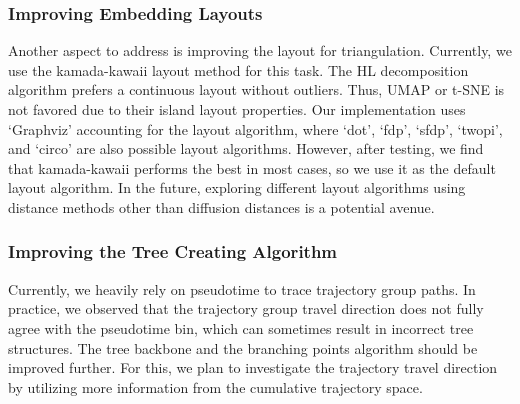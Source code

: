 \subsubsection{Improving Embedding Layouts}
Another aspect to address is improving the layout for triangulation. Currently, we use the kamada-kawaii layout method for this task. The HL decomposition algorithm prefers a continuous layout without outliers. Thus, UMAP or t-SNE is not favored due to their island layout properties. Our implementation uses `Graphviz' accounting for the layout algorithm, where `dot', `fdp', `sfdp', `twopi', and `circo' are also possible layout algorithms. However, after testing, we find that kamada-kawaii performs the best in most cases, so we use it as the default layout algorithm. In the future, exploring different layout algorithms using distance methods other than diffusion distances is a potential avenue.

\subsubsection{Improving the Tree Creating Algorithm}
Currently, we heavily rely on pseudotime to trace trajectory group paths. In practice, we observed that the trajectory group travel direction does not fully agree with the pseudotime bin, which can sometimes result in incorrect tree structures. The tree backbone and the branching points algorithm should be improved further. For this, we plan to investigate the trajectory travel direction by utilizing more information from the cumulative trajectory space.
